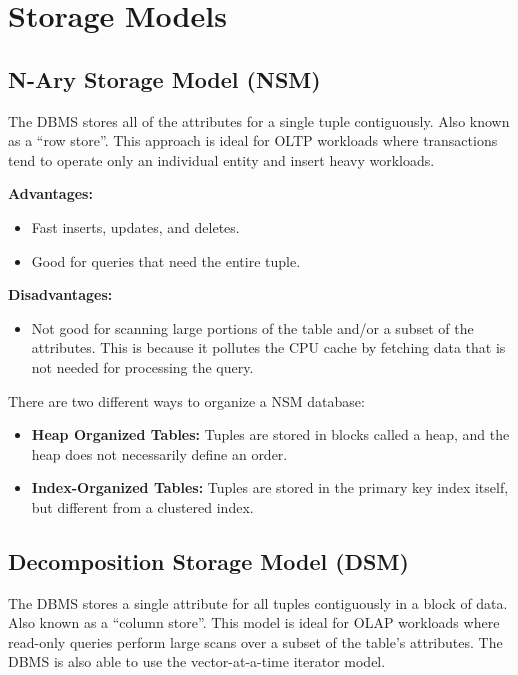 \documentclass[11pt]{article}
\begin{document}
\section{Storage Models}

\subsection*{N-Ary Storage Model (NSM)}
The DBMS stores all of the attributes for a single tuple contiguously.
Also known as a ``row store''.
This approach is ideal for OLTP workloads where transactions tend to operate only an individual 
entity and insert heavy workloads.

\textbf{Advantages:}
\begin{itemize}
    \item
    Fast inserts, updates, and deletes.
    
    \item
    Good for queries that need the entire tuple.
\end{itemize}

\textbf{Disadvantages:}
\begin{itemize}
    \item
    Not good for scanning large portions of the table and/or a subset of the attributes.
    This is because it pollutes the CPU cache by fetching data that is not needed for processing
    the query.
\end{itemize}

There are two different ways to organize a NSM database:
\begin{itemize}
    \item \textbf{Heap Organized Tables:}
    Tuples are stored in blocks called a heap, and the heap does not necessarily define an order.
    
    \item \textbf{Index-Organized Tables:}
    Tuples are stored in the primary key index itself, but different from a clustered index.
\end{itemize}
    
\subsection*{Decomposition Storage Model (DSM)}
The DBMS stores a single attribute for all tuples contiguously in a block of data. Also known as a 
``column store''. This model is ideal for OLAP workloads where read-only queries perform large scans 
over a subset of the table's attributes. The DBMS is also able to use the vector-at-a-time iterator 
model.
\end{document}
